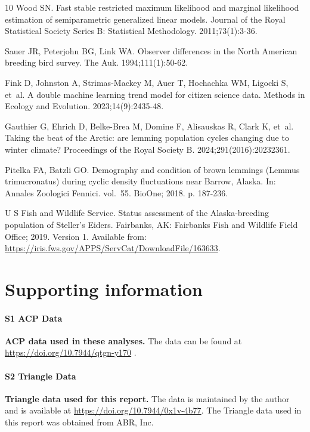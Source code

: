 \documentclass[
  10pt,
  letterpaper,
]{article}
\begin{document}
\begin{thebibliography}{10}
Wood SN.
\newblock Fast stable restricted maximum likelihood and marginal likelihood estimation of semiparametric generalized linear models.
\newblock Journal of the Royal Statistical Society Series B: Statistical Methodology. 2011;73(1):3-36.

Sauer JR, Peterjohn BG, Link WA.
\newblock Observer differences in the North American breeding bird survey.
\newblock The Auk. 1994;111(1):50-62.

Fink D, Johnston A, Strimas-Mackey M, Auer T, Hochachka WM, Ligocki S, et~al.
\newblock A double machine learning trend model for citizen science data.
\newblock Methods in Ecology and Evolution. 2023;14(9):2435-48.

Gauthier G, Ehrich D, Belke-Brea M, Domine F, Alisauskas R, Clark K, et~al.
\newblock Taking the beat of the Arctic: are lemming population cycles changing due to winter climate?
\newblock Proceedings of the Royal Society B. 2024;291(2016):20232361.

Pitelka FA, Batzli GO.
\newblock Demography and condition of brown lemmings (Lemmus trimucronatus) during cyclic density fluctuations near Barrow, Alaska.
\newblock In: Annales Zoologici Fennici. vol.~55. BioOne; 2018. p. 187-236.

{U S  Fish and Wildlife Service}.
\newblock Status assessment of the {Alaska-breeding} population of {Steller’s Eiders}.
\newblock Fairbanks, {AK}: Fairbanks Fish and Wildlife Field Office; 2019. Version 1.
\newblock Available from: \url{https://iris.fws.gov/APPS/ServCat/DownloadFile/163633}.

\end{thebibliography}


\section{Supporting information}\label{supporting-information}

\paragraph*{S1 ACP Data}
\label{s1-acpdata}
{\textbf{ACP data used in these analyses.} The data can be found at
\url{https://doi.org/10.7944/qtgn-y170} \citep{osnasACP}.}

\paragraph*{S2 Triangle Data}
\label{s2-tridata}
{\textbf{Triangle data used for this report.} The data is maintained by
the author and is available at
\url{https://doi.org/10.7944/0x1v-4b77}.
The Triangle data used in this report was obtained from ABR, Inc.~}
\end{document}

